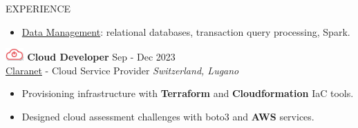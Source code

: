 \documentclass{cv} %
\def\intraexpvspace{0.15cm}
\begin{document}
\begin{minipage}[b][0.9\paperheight][t]{0.7\linewidth}
\begin{rSection}{EXPERIENCE}
\begin{itemize}
        \item \href{https://search.usi.ch/it/corsi/35268184/data-management}{Data Management}: 
        relational databases, transaction query processing, Spark.
    \end{itemize}
    \vspace{\intraexpvspace}
    \vspace{\intraexpvspace}

    \includegraphics[width=0.7cm, trim={0cm 15cm 0cm 0cm}]{claranet-logo.png}
    \textbf{Cloud Developer} \hfill Sep - Dec 2023\\
    \hspace*{0.85cm}\href{https://www.claranet.com/}{Claranet} - Cloud Service Provider
    \hfill \textit{Switzerland, Lugano}
    \begin{itemize}
        \item Provisioning infrastructure with \textbf{Terraform} and \textbf{Cloudformation}
            IaC tools.

        \item Designed cloud assessment challenges with boto3 and \textbf{AWS} services.
    \end{itemize}
    \vspace{\intraexpvspace}
    \vspace{\intraexpvspace}


\end{rSection}
\end{minipage}
\end{document}
